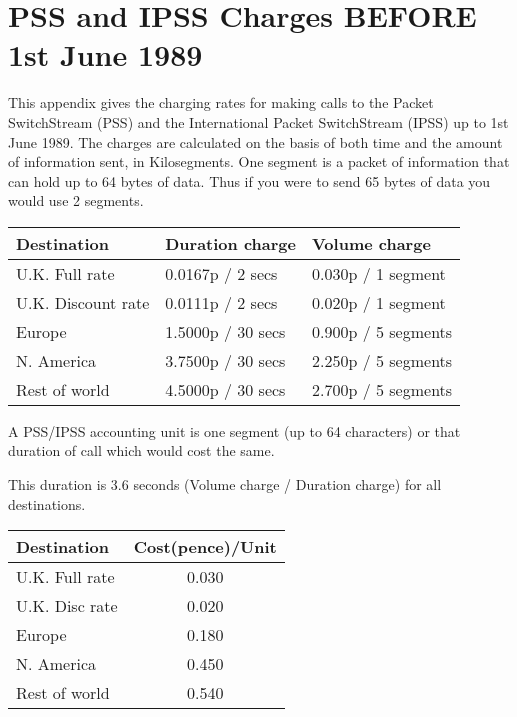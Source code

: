 \appendix

\section{PSS and IPSS Charges BEFORE 1st June 1989}

This appendix gives the charging  rates  for  making  calls  to  the Packet
SwitchStream  (PSS) and the International Packet SwitchStream (IPSS) up to
1st June 1989. The charges are calculated on the basis of  both  time  and
the amount  of  information sent, in Kilosegments.  One segment is a packet
of information that can hold up to 64 bytes of data.  Thus if you were to
send 65 bytes of data you would use 2 segments.

\begin{table}[h]
\begin{center}
\begin{tabular} {||l|l|l||}
\hline
Destination  &  Duration charge   & Volume charge \\
\hline
U.K. Full rate      &    0.0167p /  2 secs   &    0.030p / 1 segment \\
U.K. Discount rate  &    0.0111p /  2 secs   &    0.020p / 1 segment   \\
Europe              &    1.5000p / 30 secs   &    0.900p / 5 segments  \\
N. America          &    3.7500p / 30 secs   &    2.250p / 5 segments  \\
Rest of world       &    4.5000p / 30 secs   &    2.700p / 5 segments  \\
\hline
\end{tabular}
\end{center}
\end{table}

  A PSS/IPSS accounting unit is one segment (up to 64  characters)  or
  that duration of call which would cost the same.

  This duration is 3.6 seconds (Volume charge / Duration  charge)  for
  all destinations.

\begin{table}[h]
\begin{center}
\begin{tabular} {||l|c||}
\hline
Destination   &  Cost(pence)/Unit \\
\hline
U.K. Full rate       &    0.030 \\
U.K. Disc rate       &    0.020 \\
Europe               &    0.180 \\
N. America           &    0.450 \\
Rest of world        &    0.540 \\
\hline
\end{tabular}
\end{center}
\end{table}

